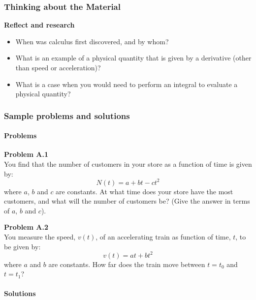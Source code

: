 \subsubsection{Thinking about the Material}

\begin{framed}
\textbf{Reflect and research}\\
\begin{itemize}
\item When was calculus first discovered, and by whom?
\item What is an example of a physical quantity that is given by a derivative (other than speed or acceleration)?
\item What is a case when you would need to perform an integral to evaluate a physical quantity?
\end{itemize}
\end{framed}

\subsubsection{Sample problems and solutions}

\paragraph{Problems}

\begin{framed}
\textbf{Problem A.1}\\
You find that the number of customers in your store as a function of time is given by:
\begin{equation}
N(t) = a+bt-ct^2
\end{equation}
where $a$, $b$ and $c$ are constants. At what time does your store have the most customers, and what will the number of customers be? (Give the answer in terms of $a$, $b$ and $c$).
\end{framed}

\begin{framed}
\textbf{Problem A.2}\\
You measure the speed, $v(t)$, of an accelerating train as function of time, $t$, to be given by:
\begin{equation}
v(t)=at+bt^2
\end{equation}
where $a$ and $b$ are constants. How far does the train move between $t=t_0$ and $t=t_1$?
\end{framed}

\paragraph{Solutions}


